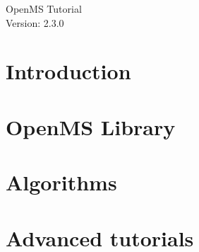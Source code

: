 \documentclass[a4paper]{article}
\newcommand{\+}{\discretionary{\mbox{\scriptsize$\hookleftarrow$}}{}{}}
\begin{document}
\begin{titlepage}
\vspace*{7cm}
\begin{center}
{\Large OpenMS Tutorial\\[1ex]\large Version: 2.3.0 }\\
\end{center}
\end{titlepage}


\setcounter{tocdepth}{2}
\tableofcontents
\pagebreak

\section{Introduction}

	
	\pagebreak
	
	\pagebreak
	
	\pagebreak
	


\pagebreak
\section{OpenMS Library}

	
	\pagebreak
	
	\pagebreak
	
	\pagebreak
	
	\pagebreak
	
	\pagebreak
	


\pagebreak
\section{Algorithms}

	
	\pagebreak
	
	\pagebreak
	
	\pagebreak
	

\pagebreak
\section{Advanced tutorials}

	
	\pagebreak
	
	\pagebreak
	
	\pagebreak
	
\end{document}
